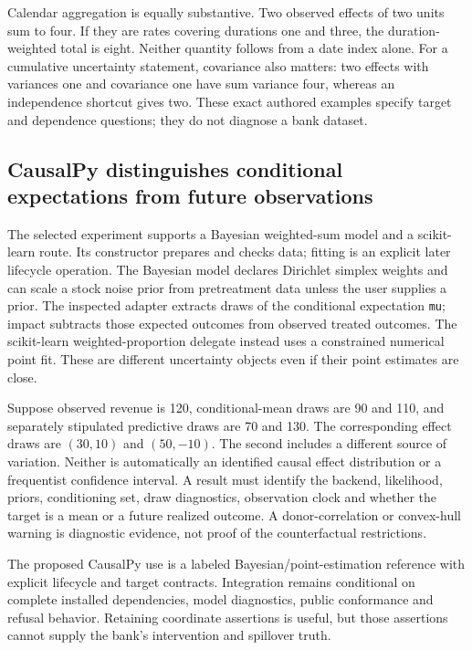 Calendar aggregation is equally substantive. Two observed effects of two
units sum to four. If they are rates covering durations one and three,
the duration-weighted total is eight. Neither quantity follows from a date
index alone. For a cumulative uncertainty statement, covariance also matters:
two effects with variances one and covariance one have sum variance four,
whereas an independence shortcut gives two. These exact authored examples
specify target and dependence questions; they do not diagnose a bank dataset.
\citep{exec25_synthpy_choice}

\subsection{CausalPy distinguishes conditional expectations from future observations}
The selected experiment supports a Bayesian weighted-sum model and a
scikit-learn route. Its constructor prepares and checks data; fitting is
an explicit later lifecycle operation. The Bayesian model declares
Dirichlet simplex weights and can scale a stock noise prior from
pretreatment data unless the user supplies a prior. The inspected adapter
extracts draws of the conditional expectation \texttt{mu}; impact subtracts
those expected outcomes from observed treated outcomes. The scikit-learn
weighted-proportion delegate instead uses a constrained numerical point
fit. These are different uncertainty objects even if their point estimates
are close.~\citep{exec25_synthpy_causalpy}

Suppose observed revenue is 120, conditional-mean draws are 90 and 110, and
separately stipulated predictive draws are 70 and 130. The corresponding
effect draws are $(30,10)$ and $(50,-10)$. The second includes a different
source of variation. Neither is automatically an identified causal effect
distribution or a frequentist confidence interval. A result must identify
the backend, likelihood, priors, conditioning set, draw diagnostics,
observation clock and whether the target is a mean or a future realized
outcome. A donor-correlation or convex-hull warning is diagnostic evidence,
not proof of the counterfactual restrictions.~\citep{exec25_synthpy_causalpy,
exec25_synthpy_choice}

The proposed CausalPy use is a labeled Bayesian/point-estimation reference
with explicit lifecycle and target contracts. Integration remains conditional
on complete installed dependencies, model diagnostics, public conformance
and refusal behavior. Retaining coordinate assertions is useful, but those
assertions cannot supply the bank's intervention and spillover truth.
\citep{exec25_synthpy_choice}

